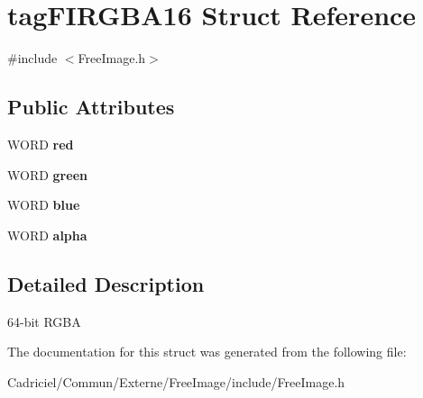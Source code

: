 \hypertarget{structtag_f_i_r_g_b_a16}{\section{tag\-F\-I\-R\-G\-B\-A16 Struct Reference}
\label{structtag_f_i_r_g_b_a16}
}


{\ttfamily \#include $<$Free\-Image.\-h$>$}

\subsection*{Public Attributes}
\begin{DoxyCompactItemize}
\item 
\hypertarget{structtag_f_i_r_g_b_a16_a580143c8b2f5e28721972342a6facd01}{W\-O\-R\-D {\bfseries red}}\label{structtag_f_i_r_g_b_a16_a580143c8b2f5e28721972342a6facd01}

\item 
\hypertarget{structtag_f_i_r_g_b_a16_a0ae72ef6b7fe786b9ea6068579cd3f2d}{W\-O\-R\-D {\bfseries green}}\label{structtag_f_i_r_g_b_a16_a0ae72ef6b7fe786b9ea6068579cd3f2d}

\item 
\hypertarget{structtag_f_i_r_g_b_a16_afe4aa863b00988ad24831a1432ef837e}{W\-O\-R\-D {\bfseries blue}}\label{structtag_f_i_r_g_b_a16_afe4aa863b00988ad24831a1432ef837e}

\item 
\hypertarget{structtag_f_i_r_g_b_a16_a9875250254b19efbfb321bf33ae2fdf6}{W\-O\-R\-D {\bfseries alpha}}\label{structtag_f_i_r_g_b_a16_a9875250254b19efbfb321bf33ae2fdf6}

\end{DoxyCompactItemize}


\subsection{Detailed Description}
64-\/bit R\-G\-B\-A 

The documentation for this struct was generated from the following file\-:\begin{DoxyCompactItemize}
\item 
Cadriciel/\-Commun/\-Externe/\-Free\-Image/include/Free\-Image.\-h\end{DoxyCompactItemize}
